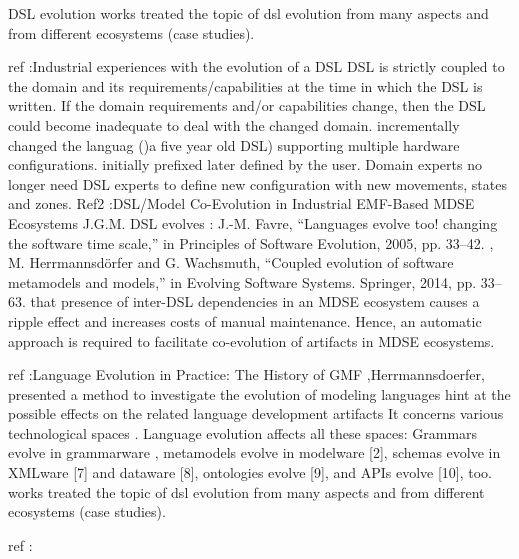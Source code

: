  DSL evolution 
  works treated the topic of dsl evolution from many aspects and from different ecosystems (case studies).
  
 ref :Industrial experiences with the evolution of a DSL \cite{schuts2021industrial}
 DSL is strictly coupled to the domain and
 its requirements/capabilities at the time in which the DSL is written. If the domain requirements and/or capabilities change, then the DSL could become inadequate to deal with the changed domain.
 incrementally changed the languag ()a five year old DSL) supporting multiple hardware configurations. initially prefixed later defined by the user. Domain experts no longer need DSL experts to define new configuration with new movements, states and zones.
 Ref2 :DSL/Model Co-Evolution in Industrial EMF-Based MDSE Ecosystems \cite{mengerink2016dsl}
 J.G.M.
 DSL evolves : J.-M. Favre, “Languages evolve too! changing the
 software time scale,” in Principles of Software
 Evolution, 2005, pp. 33–42.  \cite{favre2005languages}, M. Herrmannsdörfer and G. Wachsmuth, “Coupled
 evolution of software metamodels and models,” in
 Evolving Software Systems. Springer, 2014, pp. \cite{herrmannsdorfer2013coupled}
 33–63.
 that presence of inter-DSL dependencies in an MDSE ecosystem causes a ripple effect and increases costs of manual maintenance. Hence, an automatic approach is required to facilitate co-evolution of artifacts in MDSE ecosystems.
 
 ref :Language Evolution in Practice: The History of GMF ,Herrmannsdoerfer, \cite{10.1007/978-3-642-12107-4_3}
 presented a method to investigate the evolution of modeling languages
 hint at the possible effects on the related language development artifacts
 It concerns various technological spaces \cite{article}. Language evolution affects all these spaces: Grammars evolve in grammarware \cite{5279907}, metamodels evolve in modelware \cite{article2} [2], schemas evolve in XMLware [7] and dataware [8], ontologies evolve [9], and APIs evolve [10], too.
 works treated the topic of dsl evolution from many aspects and from different ecosystems (case studies).
 
 ref :



